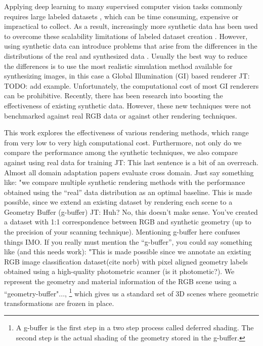 \documentclass[10pt,twocolumn,letterpaper]{article}
\newcommand{\tompson}[1]{{\color{green} JT: #1}}
\begin{document}
Applying deep learning to many supervised computer vision tasks commonly requires large labeled datasets \cite{imagenet, coco}, which can be time consuming, expensive or impractical to collect. As a result, increasingly more synthetic data has been used to overcome these scalability limitations of labeled dataset creation \cite{DBLP:journals/corr/RichterVRK16, DBLP:journals/corr/ShafaeiLS16, DBLP:journals/corr/ZhangSYSLJF16, DBLP:journals/corr/SixtWL17}. However, using synthetic data can introduce problems that arise from the differences in the distributions of the real and synthesized data \cite{2014arXiv1409.7495G}. Usually the best way to reduce the differences is to use the most realistic simulation method available for synthesizing images, in this case a Global Illumination (GI) based renderer \tompson{TODO: add example}.  Unfortunately, the computational cost of most GI renderers can be prohibitive.  Recently, there has been research into boosting the effectiveness of existing synthetic data\cite{DBLP:journals/corr/ShrivastavaPTSW16}.  However, these new techniques were not benchmarked against real RGB data or against other rendering techniques.

This work explores the effectiveness of various rendering methods, which range from very low to very high computational cost. Furthermore, not only do we compare the performance among the synthetic techniques, we also compare against using real data for training \tompson{This last sentence is a bit of an overreach. Almost all domain adaptation papers evaluate cross domain. Just say something like: "we compare multiple synthetic rendering methods with the performance obtained using the ``real'' data distribution as an optimal baseline}. This is made possible, since we extend an existing dataset by rendering each scene to a Geometry Buffer (g-buffer)\tompson{Huh? No, this doesn't make sense. You've created a dataset with 1:1 correspondence between RGB and synthetic geometry (up to the precision of your scanning technique). Mentioning g-buffer here confuses things IMO. If you really must mention the ``g-buffer'', you could say something like (and this needs work): "This is made possible since we annotate an existing RGB image classification dataset(cite norb) with pixel aligned geometry labels obtained using a high-quality photometric scanner (is it photometic?). We represent the geometry and material information of the RGB scene using a ``geometry-buffer"...}, \footnote{A g-buffer is the first step in a two step process called deferred shading. The second step is the actual shading of the geometry stored in the g-buffer.} which gives us a standard set of 3D scenes where geometric transformations are frozen in place.
\end{document}
